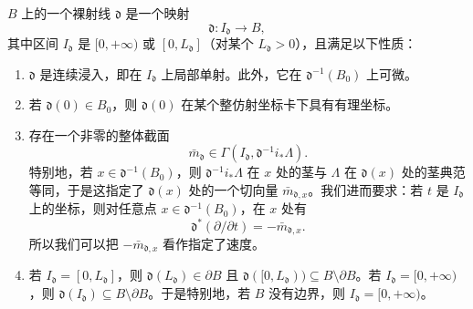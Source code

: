 \begin{definition}
$B$ 上的一个裸射线 $\mathfrak{d}$ 是一个映射
\[
\mathfrak{d}:I_{\mathfrak{d}}\to B,
\]
其中区间 $I_{\mathfrak{d}}$ 是 $[0,+\infty)$ 或 $[0,L_{\mathfrak{d}}]$（对某个 $L_{\mathfrak{d}}>0$），且满足以下性质：
\begin{enumerate}[label=(\arabic*),leftmargin=2.2em]
\item $\mathfrak{d}$ 是连续浸入，即在 $I_{\mathfrak{d}}$ 上局部单射。此外，它在 $\mathfrak{d}^{-1}(B_0)$ 上可微。
\item 若 $\mathfrak{d}(0)\in B_0$，则 $\mathfrak{d}(0)$ 在某个整仿射坐标卡下具有有理坐标。
\item 存在一个非零的整体截面
\[
\bar m_{\mathfrak{d}}\in\Gamma(I_{\mathfrak{d}},\mathfrak{d}^{-1}i_*\Lambda).
\]
特别地，若 $x\in\mathfrak{d}^{-1}(B_0)$，则 $\mathfrak{d}^{-1}i_*\Lambda$ 在 $x$ 处的茎与 $\Lambda$ 在 $\mathfrak{d}(x)$ 处的茎典范等同，于是这指定了 $\mathfrak{d}(x)$ 处的一个切向量 $\bar m_{\mathfrak{d},x}$。我们进而要求：若 $t$ 是 $I_{\mathfrak{d}}$ 上的坐标，则对任意点 $x\in\mathfrak{d}^{-1}(B_0)$，在 $x$ 处有
\[
\mathfrak{d}^*(\partial/\partial t)=-\bar m_{\mathfrak{d},x}.
\]
所以我们可以把 $-\bar m_{\mathfrak{d},x}$ 看作指定了速度。

\item 若 $I_{\mathfrak{d}}=[0,L_{\mathfrak{d}}]$，则 $\mathfrak{d}(L_{\mathfrak{d}})\in\partial B$ 且 $\mathfrak{d}([0,L_{\mathfrak{d}}))\subseteq B\setminus\partial B$。若 $I_{\mathfrak{d}}=[0,+\infty)$，则 $\mathfrak{d}(I_{\mathfrak{d}})\subseteq B\setminus\partial B$。于是特别地，若 $B$ 没有边界，则 $I_{\mathfrak{d}}=[0,+\infty)$。
\end{enumerate}
\end{definition}

